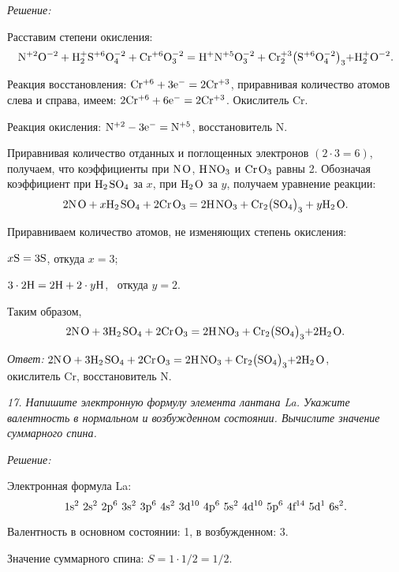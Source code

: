 \vspace*{1em}
\emph{Решение:}

Расставим степени окисления:
\[
    \mathrm{N^{+2}O^{-2} + H_2^+S^{+6}O_4^{-2} + Cr^{+6}O_3^{-2} = H^+N^{+5}O_3^{-2}
    + Cr_2^{+3}\bigr(S^{+6}O_4^{-2}\bigl)_3 + H_2^+O^{-2}}.
\]

Реакция восстановления: \( \mathrm{Cr^{+6} + 3e^- = 2Cr^{+3}} \), приравнивая
количество атомов слева и справа, имеем: \( \mathrm{2Cr^{+6} + 6e^- = 2Cr^{+3}} \).
Окислитель Cr.

Реакция окисления: \( \mathrm{N^{+2} - 3e^- = N^{+5}} \), восстановитель N.

Приравнивая количество отданных и поглощенных электронов \( (2\cdot 3 = 6) \),
получаем, что коэффициенты при \( \mathrm{N\;\!O} \), \( \mathrm{H\;\!NO_3} \) и
\( \mathrm{Cr\;\!O_3} \)  равны 2. Обозначая коэффициент при \( \mathrm{H_2\;\!SO_4} \) за
\( x \), при \( \mathrm{H_2\;\!O} \) за \( y \), получаем уравнение реакции:
\[
    \mathrm{2N\;\!O} + x\mathrm{H_2\;\!SO_4 + 2Cr\;\!O_3 = 2H\;\!NO_3 + Cr_2\bigr(SO_4\bigl)_3} +
    y\mathrm{H_2\;\!O}.
\]

Приравниваем количество атомов, не изменяющих степень окисления:
{\center
\( x\mathrm{S} = 3\mathrm{S} \), \qquad откуда \( x = 3 \);

\( \mathrm{3\cdot 2 H = 2H} + 2\cdot y\mathrm{H} \), \ откуда \( y = 2 \).

}

Таким образом, 
\[
    \mathrm{2N\;\!O + 3H_2\;\!SO_4 + 2Cr\;\!O_3 = 2H\;\!NO_3 + Cr_2\bigr(SO_4\bigl)_3 + 2H_2\;\!O}.
\]

\vspace*{2em}
\emph{Ответ:} \( \mathrm{2N\;\!O + 3H_2\;\!SO_4 + 2Cr\;\!O_3 = 2H\;\!NO_3 +
Cr_2\bigr(SO_4\bigl)_3 + 2H_2\;\!O} \),\\ окислитель Cr, восстановитель N.

\newpage %

\emph{17. Напишите электронную формулу элемента лантана La. Укажите валентность
в нормальном и возбужденном состоянии. Вычислите значение суммарного спина.}

\vspace*{2em}
\emph{Решение:}

Электронная формула La:
\[
    \text{1s\( ^{2} \) 2s\( ^{2} \) 2p\( ^{6} \) 3s\( ^{2} \) 3p\( ^{6} \) 4s\( ^{2} \) 3d\( ^{10} \) 4p\( ^{6} \)
    5s\( ^{2} \) 4d\( ^{10} \) 5p\( ^{6} \) 4f\( ^{14} \) 5d\( ^{1} \) 6s\( ^{2} \)}.
\]

Валентность в основном состоянии: 1, в возбужденном: 3.

Значение суммарного спина: \( S = 1\cdot 1/2 = 1/2 \).

